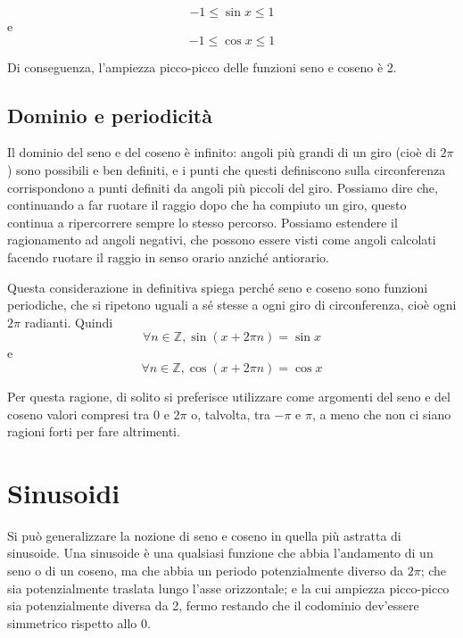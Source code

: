 \documentclass[11pt]{report}
\begin{document}
\begin{equation}
-1 \leq \sin x \leq 1
\end{equation}
e
\begin{equation}
-1 \leq \cos x \leq 1
\end{equation}

Di conseguenza, l'ampiezza picco-picco delle funzioni seno e coseno è 2.


\subsection{Dominio e periodicità}

Il dominio del seno e del coseno è infinito: angoli più grandi di un giro (cioè di $2\pi$) sono possibili e ben definiti, e i punti che questi definiscono sulla circonferenza corrispondono a punti definiti da angoli più piccoli del giro. Possiamo dire che, continuando a far ruotare il raggio dopo che ha compiuto un giro, questo continua a ripercorrere sempre lo stesso percorso. Possiamo estendere il ragionamento ad angoli negativi, che possono essere visti come angoli calcolati facendo ruotare il raggio in senso orario anziché antiorario.

Questa considerazione in definitiva spiega perché seno e coseno sono funzioni periodiche, che si ripetono uguali a sé stesse a ogni giro di circonferenza, cioè ogni $2 \pi$ radianti. Quindi
\begin{equation}
\forall n \in \mathbb{Z}, \sin(x + 2 \pi n) = \sin x
\end{equation}
e
\begin{equation}
\forall n \in \mathbb{Z}, \cos(x + 2 \pi n) = \cos x
\end{equation}

Per questa ragione, di solito si preferisce utilizzare come argomenti del seno e del coseno valori compresi tra 0 e $2 \pi$ o, talvolta, tra $-\pi$ e $\pi$, a meno che non ci siano ragioni forti per fare altrimenti.





\section{Sinusoidi}

Si può generalizzare la nozione di seno e coseno in quella più astratta di sinusoide. Una sinusoide è una qualsiasi funzione che abbia l'andamento di un seno o di un coseno, ma che abbia un periodo potenzialmente diverso da $2 \pi$; che sia potenzialmente traslata lungo l'asse orizzontale; e la cui ampiezza picco-picco sia potenzialmente diversa da 2, fermo restando che il codominio dev'essere simmetrico rispetto allo 0.
\end{document}

